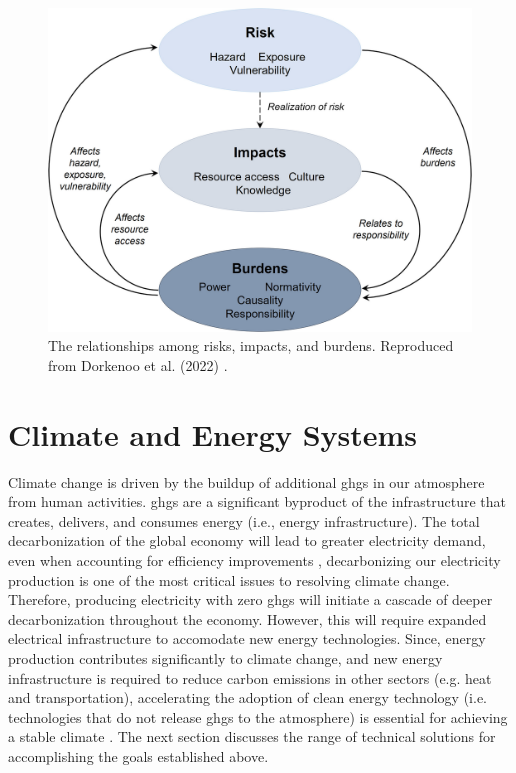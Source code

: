 \begin{figure}
    \centering
    \includegraphics[width=\columnwidth]{figures/dorkenoo-disproportionality.jpg}
    \caption{The relationships among risks, impacts, and burdens. Reproduced
    from Dorkenoo et al. (2022) \cite{dorkenoo_critical_2022}.}
    \label{fig:risk-impact-burden}
\end{figure}



\section{Climate and Energy Systems}

Climate change is driven by the buildup of additional \acp{ghg} in our atmosphere
from human activities.
\acp{ghg} are a significant byproduct of the
infrastructure that creates, delivers, and consumes energy (i.e., energy
infrastructure). The total decarbonization of the global economy
will lead to greater electricity demand, even when accounting for efficiency
improvements
\cite{national_academies_of_sciences_engineering_and_medicine_accelerating_2021,
mai_electrification_2018}, decarbonizing our electricity production is one of
the most critical issues to resolving climate change. Therefore, producing
electricity with zero \acp{ghg} will initiate a cascade of deeper
decarbonization throughout the economy. However, this will require expanded electrical
infrastructure to accomodate new energy technologies. Since, energy production contributes
significantly to climate change, and new energy infrastructure is required to reduce carbon
emissions in other sectors (e.g. heat and transportation), accelerating the adoption of clean energy technology
(i.e. technologies that do not release \acp{ghg} to the atmosphere) is
essential for achieving a stable climate \cite{roelfsema_taking_2020,
taylor_managing_2021}.
The next section discusses the range of technical solutions for accomplishing the
goals established above.

